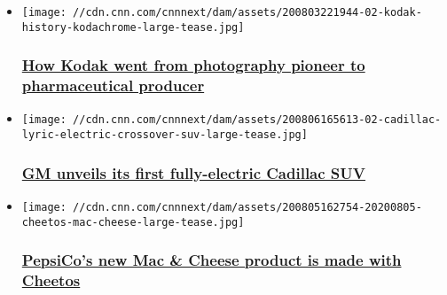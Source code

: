 \begin{itemize}
\item
  \href{/2020/08/04/business/kodak-history-pharmaceutical-production/index.html}{}

  \texttt{[image: //cdn.cnn.com/cnnnext/dam/assets/200803221944-02-kodak-history-kodachrome-large-tease.jpg]}

  \hypertarget{how-kodak-went-from-photography-pioneer-to-pharmaceutical-producer}{%
  \subsubsection{\texorpdfstring{\href{/2020/08/04/business/kodak-history-pharmaceutical-production/index.html}{How
  Kodak went from photography pioneer to pharmaceutical
  producer}}{How Kodak went from photography pioneer to pharmaceutical producer}}\label{how-kodak-went-from-photography-pioneer-to-pharmaceutical-producer}}
\item
  \href{/2020/08/06/success/gm-cadillc-lyriq-electric-suv/index.html}{}

  \texttt{[image: //cdn.cnn.com/cnnnext/dam/assets/200806165613-02-cadillac-lyric-electric-crossover-suv-large-tease.jpg]}

  \hypertarget{gm-unveils-its-first-fully-electric-cadillac-suv}{%
  \subsubsection{\texorpdfstring{\href{/2020/08/06/success/gm-cadillc-lyriq-electric-suv/index.html}{GM
  unveils its first fully-electric Cadillac
  SUV}}{GM unveils its first fully-electric Cadillac SUV}}\label{gm-unveils-its-first-fully-electric-cadillac-suv}}
\item
  \href{/2020/08/05/business/cheetos-mac-and-cheese/index.html}{}

  \texttt{[image: //cdn.cnn.com/cnnnext/dam/assets/200805162754-20200805-cheetos-mac-cheese-large-tease.jpg]}

  \hypertarget{pepsicos-new-mac--cheese-product-is-made-with-cheetos-}{%
  \subsubsection{\texorpdfstring{\href{/2020/08/05/business/cheetos-mac-and-cheese/index.html}{PepsiCo's
  new Mac \& Cheese product is made with Cheetos
  }}{PepsiCo's new Mac \& Cheese product is made with Cheetos }}\label{pepsicos-new-mac--cheese-product-is-made-with-cheetos-}}
\end{itemize}

